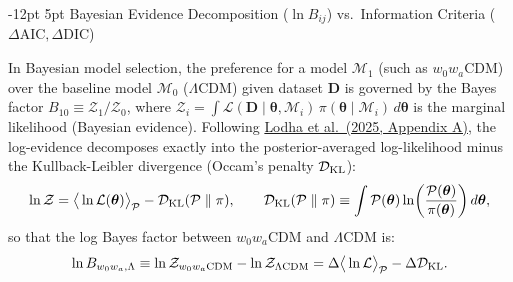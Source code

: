 \documentclass[11pt,letterpaper]{article}
\makeatletter
\renewcommand{\subsection}{\@startsection{subsection}{2}{\z@}%
  {-12pt \@plus -3pt \@minus -1pt}%
  {5pt \@plus 1pt}%
  {\normalfont\large\bfseries\color{tealaccent}}}
\makeatother
\begin{document}
\subsection{Bayesian Evidence Decomposition ($\ln B_{ij}$) vs.\ Information Criteria ($\Delta\text{AIC}, \Delta\text{DIC}$)}

In Bayesian model selection, the preference for a model $\mathcal{M}_1$ (such as $w_0 w_a$CDM) over the baseline model $\mathcal{M}_0$ ($\Lambda$CDM) given dataset $\mathbf{D}$ is governed by the Bayes factor $B_{10} \equiv \mathcal{Z}_1 / \mathcal{Z}_0$, where $\mathcal{Z}_i = \int \mathcal{L}(\mathbf{D}\mid\boldsymbol{\theta}, \mathcal{M}_i)\, \pi(\boldsymbol{\theta}\mid\mathcal{M}_i)\, d\boldsymbol{\theta}$ is the marginal likelihood (Bayesian evidence). Following \href{https://arxiv.org/abs/2503.14743}{Lodha et al.\ (2025, Appendix A)}, the log-evidence decomposes exactly into the posterior-averaged log-likelihood minus the Kullback-Leibler divergence (Occam's penalty $\mathcal{D}_{\rm KL}$):
\begin{equation}
    \ln \mathcal{Z} = \big\langle \ln \mathcal{L}(\boldsymbol{\theta}) \big\rangle_{\mathcal{P}} - \mathcal{D}_{\rm KL}(\mathcal{P} \parallel \pi), \qquad \mathcal{D}_{\rm KL}(\mathcal{P} \parallel \pi) \equiv \int \mathcal{P}(\boldsymbol{\theta}) \ln\!\left( \frac{\mathcal{P}(\boldsymbol{\theta})}{\pi(\boldsymbol{\theta})} \right) d\boldsymbol{\theta},
    \label{eq:evidence_kl}
\end{equation}
so that the log Bayes factor between $w_0 w_a$CDM and $\Lambda$CDM is:
\begin{equation}
    \ln B_{w_0 w_a, \Lambda} \equiv \ln \mathcal{Z}_{w_0 w_a\text{CDM}} - \ln \mathcal{Z}_{\Lambda\text{CDM}} = \Delta \big\langle \ln \mathcal{L} \big\rangle_{\mathcal{P}} - \Delta \mathcal{D}_{\rm KL}.
    \label{eq:bayes_factor_decomp}
\end{equation}
\end{document}
